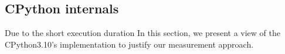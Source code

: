 \subsection{CPython internals}
\label{ssec:profiling-bytecode-cpython-internals}


Due to the short execution duration
In this section, we present a view of the CPython3.10's implementation to justify our measurement approach.


